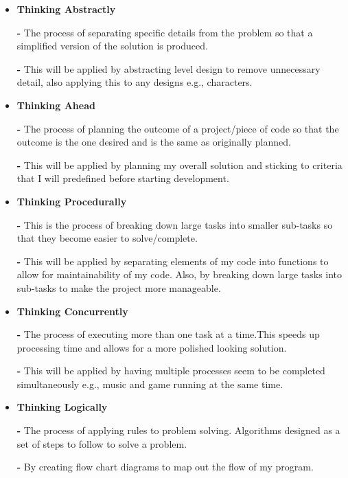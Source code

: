 \documentclass[12pt]{report}
\begin{document}
\begin{itemize}
    \item \textbf{Thinking Abstractly}
    \setlength{\itemindent}{0.3in}
    \item[\textbf{-}] The process of separating specific details from the problem so that a simplified version of the solution is produced.
    \item[\textbf{-}] This will be applied by abstracting level design to remove unnecessary detail, also applying this to any designs e.g., characters.
    \setlength{\itemindent}{0in}
    \item \textbf{Thinking Ahead}
    \setlength{\itemindent}{0.3in}
    \item[\textbf{-}]The process of planning the outcome of a project/piece of code so that the outcome is the one desired and is the same as originally planned.
    \item[\textbf{-}] This will be applied by planning my overall solution and sticking to criteria that I will predefined before starting development.
    \setlength{\itemindent}{0in}
    \item \textbf{Thinking Procedurally}
    \setlength{\itemindent}{0.3in}
    \item[\textbf{-}] This  is  the  process  of  breaking  down  large  tasks  into smaller sub-tasks so that they become easier to solve/complete.
    \item[\textbf{-}]This will be applied by separating elements of my code into functions to  allow  for  maintainability  of  my  code.   Also,  by  breaking  down  large  tasks  into sub-tasks to make the project more manageable. 
    \setlength{\itemindent}{0in}
    \item \textbf{Thinking Concurrently}
    \setlength{\itemindent}{0.3in}
    \item[\textbf{-}] The process of executing more than one task at a time.This speeds up processing time and allows for a more polished looking solution.
    \item[\textbf{-}] This will be applied by having multiple processes seem to be completed simultaneously e.g., music and game running at the same time.
    \setlength{\itemindent}{0in}
    \item \textbf{Thinking Logically}
    \setlength{\itemindent}{0.3in}
    \item[\textbf{-}] The process of applying rules to problem solving. Algorithms designed as a set of steps to follow to solve a problem. 
    \item[\textbf{-}] By creating flow chart diagrams to map out the flow of my program.
    \setlength{\itemindent}{0in}
\end{itemize}
\end{document}

